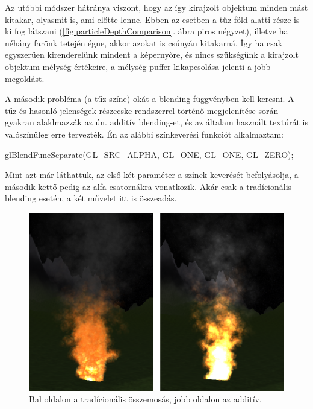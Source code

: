 Az utóbbi módszer hátránya viszont, hogy az így kirajzolt objektum minden mást kitakar, olyasmit is, ami előtte lenne. Ebben az esetben a tűz föld alatti része is ki fog látszani (\ref{fig:particleDepthComparison}. ábra piros négyzet), illetve ha néhány farönk tetején égne, akkor azokat is csúnyán kitakarná. Így ha csak egyszerűen kirenderelünk mindent a képernyőre, és nincs szükségünk a kirajzolt objektum mélység értékeire, a mélység puffer kikapcsolása jelenti a jobb megoldást.


A második probléma (a tűz színe) okát a blending függvényben kell keresni. A tűz és hasonló jelenségek részecske rendszerrel történő megjelenítése során gyakran alaklmazzák az ún. additív blending-et, és az általam használt textúrát is valószínűleg erre tervezték. Én az alábbi színkeverési funkciót alkalmaztam: 
\begin{cpp}
glBlendFuncSeparate(GL_SRC_ALPHA, GL_ONE, GL_ONE, GL_ZERO); 
\end{cpp}
Mint azt már láthattuk, az első két paraméter a színek keverését befolyásolja, a második kettő pedig az alfa csatornákra vonatkozik. Akár csak a tradícionális blending esetén, a két művelet itt is összeadás. 
\begin{figure}[h]
 \centering
 \includegraphics[width=\textwidth]{kepek/particleBlendingComparison.png}
 \caption{Bal oldalon a tradícionális összemosás, jobb oldalon az additív.}
 \label{fig:particleBlendingComparison}
\end{figure}

